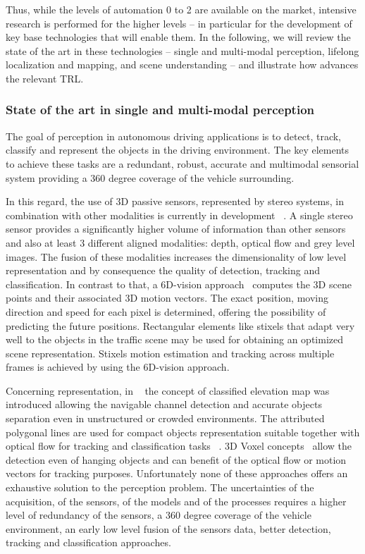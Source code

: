 Thus, while the levels of automation 0 to 2 are available on the market, intensive research is performed for the higher levels -- in particular for the development of key base technologies that will enable them. In the following, we will review the state of the art in these technologies -- single and multi-modal perception, lifelong localization and mapping, and scene understanding -- and illustrate how \Project{} advances the relevant TRL.




\subsubsection{State of the art in single and multi-modal perception}

The goal of perception in autonomous driving applications is to detect, track, classify and represent the objects in the driving environment. The key elements to achieve these tasks are a redundant, robust, accurate and multimodal sensorial system providing a 360 degree coverage of the vehicle surrounding. 

In this regard, the use of 3D passive sensors, represented by stereo systems, in combination with other modalities is currently in development ~\cite{utc-Franke, utc-Oniga, utc-Vatavu, utc-Broggi}. A single stereo sensor provides a significantly higher volume of information than other sensors and also at least 3 different aligned modalities: depth, optical flow and grey level images. The fusion of these modalities increases the dimensionality of low level representation and by consequence the quality of detection, tracking and classification. In contrast to that, a 6D-vision approach~\cite{utc-Franke} computes the 3D scene points and their associated 3D motion vectors. The exact position, moving direction and speed for each pixel is determined, offering the possibility of predicting the future positions. Rectangular elements like stixels that adapt very well to the objects in the traffic scene may be used for obtaining an optimized scene	 representation. Stixels motion estimation and tracking across multiple frames is achieved by using the 6D-vision approach. 

Concerning representation, in ~\cite{utc-Oniga} the concept of classified elevation map was introduced allowing the navigable channel detection and accurate objects separation even in unstructured or crowded environments. The attributed polygonal lines are used for compact objects representation suitable together with optical flow for tracking and classification tasks ~\cite{utc-Vatavu}. 3D Voxel concepts~\cite{utc-Broggi} allow the detection even of hanging objects and can benefit of the optical flow or motion vectors for tracking purposes.
Unfortunately none of these approaches offers an exhaustive solution to the perception problem. The uncertainties of the acquisition, of the sensors, of the models and of the processes requires a higher level of redundancy of the sensors, a 360 degree coverage of the vehicle environment, an early low level fusion of the sensors data, better detection, tracking and classification approaches. 

